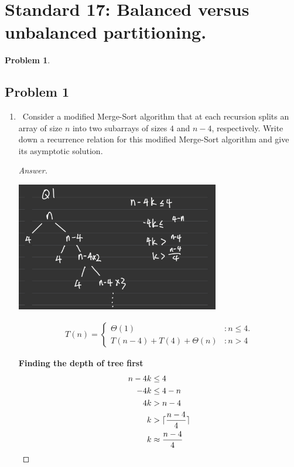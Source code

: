 \documentclass[11pt]{article}
\DeclarePairedDelimiter\ceil{\lceil}{\rceil}
\theoremstyle{definition}
\theoremstyle{definition}
\newtheorem{required}{Problem}
\theoremstyle{definition}
\begin{document}
\newpage
\section{Standard 17: Balanced versus unbalanced partitioning.}

\begin{required}
\subsection{Problem 1}
\begin{enumerate}[label=(\alph*)]
\item \label{(a).}~Consider a modified Merge-Sort algorithm that at each recursion splits an array of size $n$  into two subarrays of sizes $4$ and $n-4$, respectively. Write down a recurrence relation for this modified Merge-Sort algorithm and give its asymptotic solution.

\begin{proof}[Answer]
\begin{center}
\includegraphics[width=0.7\textwidth]{HW6_Q1(a).PNG}
\end{center}

\begin{align*}
T(n) = \begin{cases}
\Theta(1)& : n \leq 4.\\
T(n-4) + T(4) +\Theta(n)& : n > 4 
\end{cases}
\end{align*}


\textbf{Finding the depth of tree first}
\begin{align*}
n-4k & \leq 4\\
-4k &\leq 4-n \\
4k &> n-4\\
k &>\ceil{ \frac{n-4}{4}}\\
k &\approx   \frac{n-4}{4}
\end{align*}


\end{proof}
\end{enumerate}
\end{required}
\end{document}
